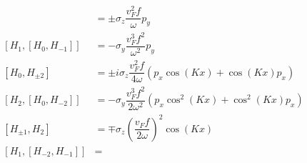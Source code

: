 \begin{align}
  [H_{0}, H_{\pm1}] &= \pm \sigma_z \dfrac{v_{F}^{2} f}{\omega} p_y \nonumber \\
  [H_{1}, [H_{0}, H_{-1}]] &= - \sigma_y \dfrac{v_{F}^3 f^2}{\omega^2} p_y \\
  [H_{0}, H_{\pm2}] &= \pm i \sigma_z \dfrac{v_{F}^{2} f}{4\omega} \left(p_x \cos{(Kx)} + \cos{(Kx)} p_x \right) \nonumber \\
  [H_{2}, [H_{0}, H_{-2}]] &= - \sigma_y \dfrac{v_{F}^3 f^2}{2 \omega^2} \left( p_x \cos^2{(Kx)} + \cos^2{(Kx)} p_x \right) \\
  [H_{\pm1}, H_{2}] &= \mp \sigma_z \left(\dfrac{v_{F} f}{2\omega} \right)^{2} \cos{(Kx)} \nonumber \\
  [H_{1}, [H_{-2},H_{-1}]] &=
\end{align}
